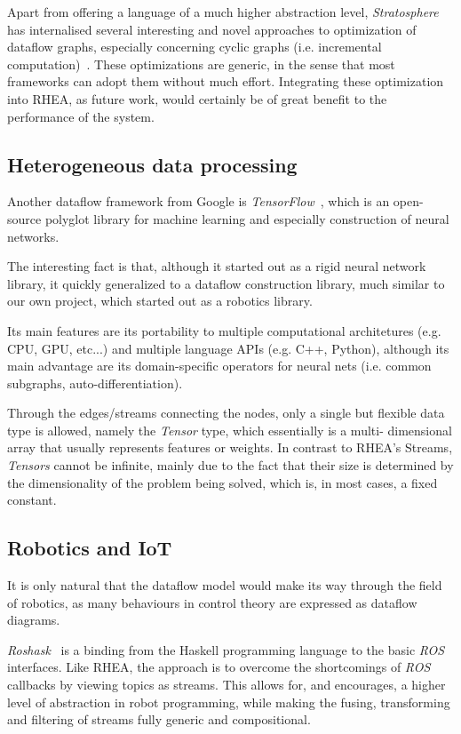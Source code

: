\documentclass[sigplan,review,anonymous,screen]{acmart}
\begin{document}
Apart from offering a language of a much higher abstraction level,
\textit{Stratosphere} has internalised several interesting and novel approaches
to optimization of dataflow graphs, especially concerning cyclic graphs (i.e.
incremental computation)~\cite{spinning}. These optimizations are generic, in the
sense that most frameworks can adopt them without much effort. Integrating these
optimization into \textsc{RHEA}, as future work, would certainly be of great
benefit to the performance of the system.

\subsection{Heterogeneous data processing}
Another dataflow framework from Google is
\textit{TensorFlow}~\cite{tensorflow}, which is an open-source
polyglot library for machine learning and especially construction of neural
networks.

The interesting fact is that, although it started out as a rigid neural network
library, it quickly generalized to a dataflow construction library, much similar
to our own project, which started out as a robotics library.

Its main features are its portability to multiple computational architetures
(e.g. CPU, GPU, etc...) and multiple language APIs (e.g. C++, Python), although
its main advantage are its domain-specific operators for neural nets (i.e.
common subgraphs, auto-differentiation).

Through the edges/streams connecting the nodes, only a single but flexible data
type is allowed, namely the \textit{Tensor} type, which essentially is a multi-
dimensional array that usually represents features or weights. In contrast to
\textsc{RHEA}'s Streams, \textit{Tensors} cannot be infinite, mainly due to the
fact that their size is determined by the dimensionality of the problem being
solved, which is, in most cases, a fixed constant.


\subsection{Robotics and IoT}

It is only natural that the dataflow model would make its way through the field
of robotics, as many behaviours in control theory are expressed as dataflow
diagrams.

\textit{Roshask}~\cite{roshask} is a binding from the Haskell programming language
to the basic \textit{ROS} interfaces. Like \textsc{RHEA}, the approach is to
overcome the shortcomings of \textit{ROS} callbacks by viewing topics as
streams. This allows for, and encourages, a higher level of abstraction in
robot programming, while making the fusing, transforming and filtering of
streams fully generic and compositional.
\end{document}
